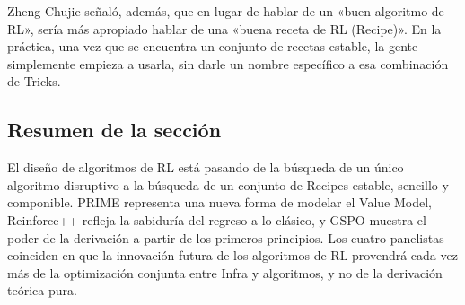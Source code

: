 Zheng Chujie señaló, además, que en lugar de hablar de un «buen algoritmo de RL», sería más apropiado hablar de una «buena receta de RL (Recipe)». En la práctica, una vez que se encuentra un conjunto de recetas estable, la gente simplemente empieza a usarla, sin darle un nombre específico a esa combinación de Tricks.

\subsection{Resumen de la sección}

El diseño de algoritmos de RL está pasando de la búsqueda de un único algoritmo disruptivo a la búsqueda de un conjunto de Recipes estable, sencillo y componible. PRIME representa una nueva forma de modelar el Value Model, Reinforce++ refleja la sabiduría del regreso a lo clásico, y GSPO muestra el poder de la derivación a partir de los primeros principios. Los cuatro panelistas coinciden en que la innovación futura de los algoritmos de RL provendrá cada vez más de la optimización conjunta entre Infra y algoritmos, y no de la derivación teórica pura.
